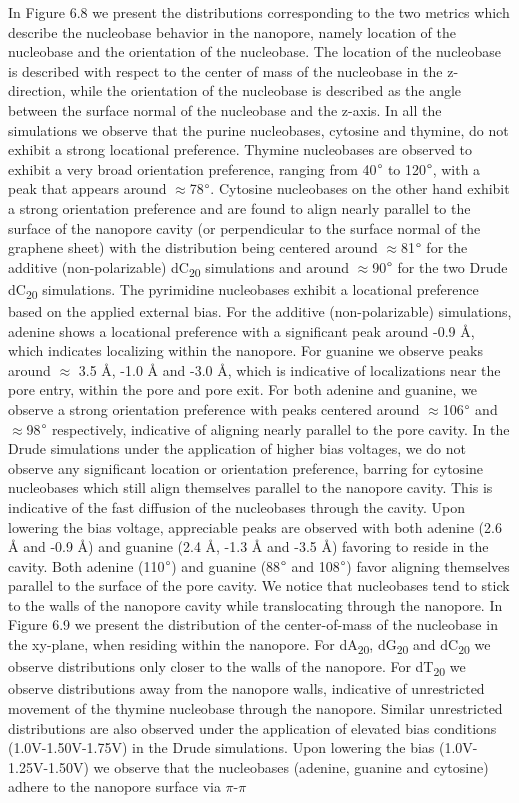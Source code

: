 In Figure 6.8 we present the distributions corresponding to the two metrics which describe the nucleobase behavior in the nanopore, namely location of the nucleobase and the orientation of the nucleobase. The location of the nucleobase is described with respect to the center of mass of the nucleobase in the z-direction, while the orientation of the nucleobase is described as the angle between the surface normal of the nucleobase and the z-axis. In all the simulations we observe that the purine nucleobases, cytosine and thymine, do not exhibit a strong locational preference. Thymine nucleobases are observed to exhibit a very broad orientation preference, ranging from 40$\degree$ to 120$\degree$, with a peak that appears around $\approx$78$\degree$. Cytosine nucleobases on the other hand exhibit a strong orientation preference and are found to align nearly parallel to the surface of the nanopore cavity (or perpendicular to the surface normal of the graphene sheet) with the distribution being centered around $\approx$81$\degree$ for the additive (non-polarizable) dC\textsubscript{20} simulations and around $\approx$90$\degree$ for the two Drude dC\textsubscript{20} simulations. The pyrimidine nucleobases exhibit a locational preference based on the applied external bias. For the additive (non-polarizable) simulations, adenine shows a locational preference with a significant peak around -0.9 Å, which indicates localizing within the nanopore. For guanine we observe peaks around $\approx$ 3.5 Å, -1.0 Å and -3.0 Å, which is indicative of localizations near the pore entry, within the pore and pore exit. For both adenine and guanine, we observe a strong orientation preference with peaks centered around $\approx$106$\degree$ and $\approx$98$\degree$ respectively, indicative of aligning nearly parallel to the pore cavity. In the Drude simulations under the application of higher bias voltages, we do not observe any significant location or orientation preference, barring for cytosine nucleobases which still align themselves parallel to the nanopore cavity. This is indicative of the fast diffusion of the nucleobases through the cavity. Upon lowering the bias voltage, appreciable peaks are observed with both adenine (2.6 Å and -0.9 Å) and guanine (2.4 Å, -1.3 Å and -3.5 Å) favoring to reside in the cavity. Both adenine (110$\degree$) and guanine (88$\degree$ and 108$\degree$) favor aligning themselves parallel to the surface of the pore cavity. We notice that nucleobases tend to stick to the walls of the nanopore cavity while translocating through the nanopore. In Figure 6.9 we present the distribution of the center-of-mass of the nucleobase in the xy-plane, when residing within the nanopore. For dA\textsubscript{20}, dG\textsubscript{20} and dC\textsubscript{20} we observe distributions only closer to the walls of the nanopore. For dT\textsubscript{20} we observe distributions away from the nanopore walls, indicative of unrestricted movement of the thymine nucleobase through the nanopore. Similar unrestricted distributions are also observed under the application of elevated bias conditions (1.0V-1.50V-1.75V) in the Drude simulations. Upon lowering the bias (1.0V-1.25V-1.50V) we observe that the nucleobases (adenine, guanine and cytosine) adhere to the nanopore surface via $\pi$-$\pi$ 
